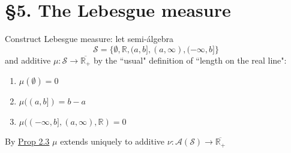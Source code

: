 \documentclass[hidelinks]{article}
\theoremstyle{definition}
\theoremstyle{dotless}
\theoremstyle{remark}
\begin{document}
\bigbreak

\section*{\S5. The Lebesgue measure}
\setcounter{section}{5}

Construct Lebesgue measure: let semi-álgebra \[\mathscr{S}=\{\emptyset,\mathbb{R},(a,b],(a,\infty),(-\infty,b]\}\] and additive $\mu:\mathscr{S}\to\overline{\mathbb{R}_+}$ by the ``usual" definition of ``length on the real line":\begin{enumerate}[label=\arabic*\degree]
    \item $\mu(\emptyset)=0$
    \item $\mu((a,b])=b-a$
    \item $\mu((-\infty,b],(a,\infty),\mathbb{R})=0$
\end{enumerate}
By \hyperref[Prop 2.3]{Prop 2.3} $\mu$ extends uniquely to additive $\nu:\mathscr{A}(\mathscr{S})\to\overline{\mathbb{R}_+}$
\end{document}
